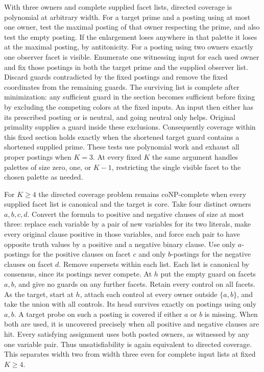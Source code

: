 With three owners and complete supplied facet lists, directed
coverage is polynomial at arbitrary width. For a target prime
and a posting using at most one owner, test the maximal
posting of that owner respecting the prime, and also test
the empty posting. If the enlargement loses anywhere in
that palette it loses at the maximal posting, by antitonicity.
For a posting using two owners exactly one observer facet
is visible. Enumerate one witnessing input for each used
owner and fix those postings in both the target prime and
the supplied observer list. Discard guards contradicted by
the fixed postings and remove the fixed coordinates from
the remaining guards. The surviving list is complete after
minimization: any sufficient guard in the section becomes
sufficient before fixing by excluding the competing colors
at the fixed inputs. An input then either has its prescribed
posting or is neutral, and going neutral only helps.
Original primality supplies a guard inside these exclusions.
Consequently coverage within this fixed section holds exactly
when the shortened target guard contains a shortened supplied
prime. These tests use polynomial work and exhaust all proper
postings when $K=3$. At every fixed $K$ the same argument
handles palettes of size zero, one, or $K-1$, restricting
the single visible facet to the chosen palette as needed.

For $K\ge4$ the directed coverage problem remains
coNP-complete when every supplied facet list is canonical
and the target is core. Take four distinct owners $a,b,c,d$.
Convert the formula to positive and negative clauses of
size at most three: replace each variable by a pair of
new variables for its two literals, make every original
clause positive in those variables, and force each pair
to have opposite truth values by a positive and a negative
binary clause. Use only $a$-postings for the positive
clauses on facet $c$ and only $b$-postings for the negative
clauses on facet $d$. Remove supersets within each list.
Each list is canonical by consensus, since its postings
never compete. At $h$ put the empty guard on facets $a,b$,
and give no guards on any further facets. Retain every
control on all facets. As the target, start at $h$, attach
each control at every owner outside $\{a,b\}$, and take
the union with all controls. Its head survives exactly
on postings using only $a,b$. A target probe on such
a posting is covered if either $a$ or $b$ is missing.
When both are used, it is uncovered precisely when
all positive and negative clauses are hit. Every satisfying
assignment uses both posted owners, as witnessed by any
one variable pair. Thus unsatisfiability is again
equivalent to directed coverage. This separates width two
from width three even for complete input lists at fixed
$K\ge4$.

